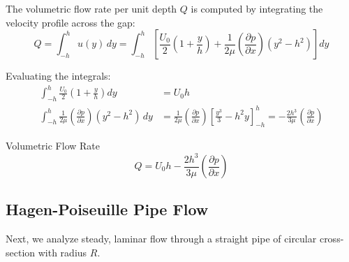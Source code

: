 The volumetric flow rate per unit depth $Q$ is computed by integrating the velocity profile across the gap:
\begin{equation}
Q = \int_{-h}^{h} u(y) \, dy = \int_{-h}^{h} \left[ \frac{U_0}{2} \left( 1 + \frac{y}{h} \right) + \frac{1}{2\mu} \left( \frac{\partial p}{\partial x} \right) (y^2 - h^2) \right] dy
\end{equation}

Evaluating the integrals:
\begin{align}
\int_{-h}^{h} \frac{U_0}{2} \left( 1 + \frac{y}{h} \right) dy &= U_0 h \\[0.5em]
\int_{-h}^{h} \frac{1}{2\mu} \left( \frac{\partial p}{\partial x} \right) (y^2 - h^2) \, dy &= \frac{1}{2\mu} \left( \frac{\partial p}{\partial x} \right) \left[ \frac{y^3}{3} - h^2 y \right]_{-h}^{h} = -\frac{2h^3}{3\mu} \left( \frac{\partial p}{\partial x} \right)
\end{align}

\begin{resultboxnamed}{Volumetric Flow Rate}
\begin{equation}
Q = U_0 h - \frac{2h^3}{3\mu} \left( \frac{\partial p}{\partial x} \right)
\end{equation}
\end{resultboxnamed}

\subsection{Hagen-Poiseuille Pipe Flow}

Next, we analyze steady, laminar flow through a straight pipe of circular cross-section with radius $R$.

